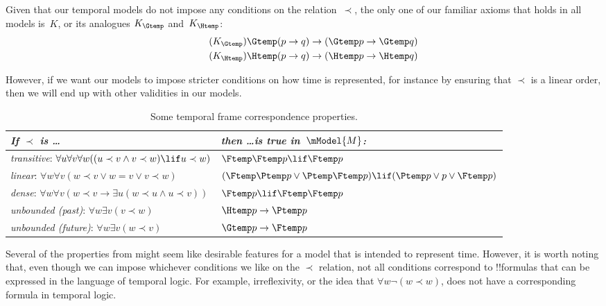 \documentclass[../../../include/open-logic-section]{subfiles}
\begin{document}


Given that our temporal models do not impose any conditions on the relation~$\prec$, the only one of our familiar axioms
that holds in all models is~$K$, or its analogues $K_{\Gtemp}$ and~$K_{\Htemp}$:
\begin{align*}
\tag{$K_{\Gtemp}$}  \Gtemp (p \to q) & \to (\Gtemp p \to \Gtemp q)\\
\tag{$K_{\Htemp}$}  \Htemp (p \to q) & \to (\Htemp p \to \Htemp q)
\end{align*}

However, if we want our models to impose stricter conditions on how time is represented, for instance by ensuring that
$\prec$ is a linear order, then we will end up with other validities in our models.

\begin{table}[t]
    \begin{tabular}{| p{} || p{} |}
      \hline
      {\emph{If $\prec$ is \dots}} & {\emph{then \dots is true in~$\mModel{M}$:}} \\
      \hline \hline
      \emph{transitive}: \newline
      $\forall u \forall v \forall w ((u \prec v \land v \prec w) \lif u \prec w)$ & 
      $\Ftemp \Ftemp p \lif \Ftemp p$  \\
      \hline 
      \emph{linear}: \newline
      $\forall w \forall v (w \prec v \lor w = v \lor v \prec w)$ &  
      $(\Ftemp \Ptemp  p \lor \Ptemp \Ftemp p) \lif (\Ptemp p \lor p \lor \Ftemp p)$ \\
      \hline
      \emph{dense}: \newline
      $\forall w \forall v (w \prec v \to \exists u(w \prec u \land u \prec v))$ &  
      $\Ftemp p \lif \Ftemp \Ftemp p$ \\
      \hline
      \emph{unbounded (past)}: \newline
      $\forall w \exists v( v \prec w)$ &  
      $\Htemp p \to \Ptemp p$ \\
      \hline
      \emph{unbounded (future)}: \newline
      $\forall w \exists v( w \prec v)$ &  
      $\Gtemp p \to \Ftemp p$ \\

      \hline

    \end{tabular}
    \caption{Some temporal frame correspondence properties.}
  \end{table} 

Several of the properties from  might seem like desirable features 
for a model that is intended to
represent time. However, it is worth noting that, even though we can impose whichever conditions 
we like on the $\prec$ relation, not all conditions correspond to !!{formula}s that can be expressed in
the language of temporal logic. For example, irreflexivity, or the idea that $\forall w \lnot (w \prec w)$,
does not have a corresponding formula in temporal logic. 
\end{document}
